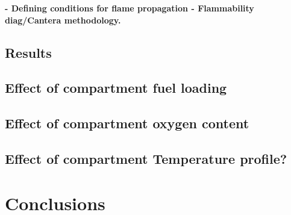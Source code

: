 \documentclass[12pt,letterpaper]{article}
\begin{document}
\begin{flushleft}


\textbf{- Defining conditions for flame propagation - Flammability diag/Cantera methodology.}






\subsection{Results} \addvspace{10pt}
\label{sec:results}

\subsection{Effect of compartment fuel loading}
\label{sec:resfuel}


\subsection{Effect of compartment oxygen content}
\label{sec:resfuel}


\subsection{Effect of compartment Temperature profile?}
\label{sec:restemp}


\section{Conclusions}



 



\end{flushleft}
\end{document}
